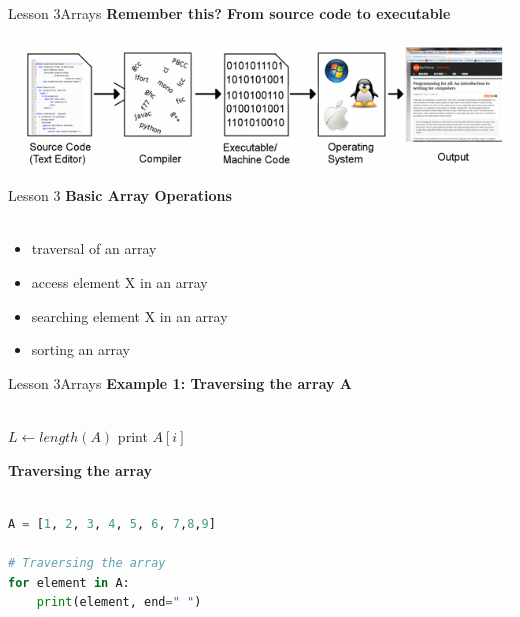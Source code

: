 \documentclass[aspectratio=1610]{beamer}
\begin{document}
\begin{frame}{Lesson 3}{Arrays}
\Large
\textbf{Remember this? From source code to executable}\\~\\ 
\includegraphics[scale=0.65]{Images/CompilationChain}
\end{frame}



\begin{frame}{Lesson 3}{}
\LARGE
\textbf{Basic Array Operations}\\~\\
\begin{itemize}
	\item traversal of an array
	\item access element X in an array
	\item searching element X in an array
	\item sorting an array
\end{itemize}
\end{frame}



\begin{frame}{Lesson 3}{Arrays}
\Large
\textbf{Example 1: Traversing the array A}\\~\\

\label{getArray}
\begin{algorithmic}[1]
 
\State $L\gets length(A)$
    \State print $A[i]$
\EndFor
\EndProcedure
\end{algorithmic}
\end{frame}


\begin{frame}[fragile]
\LARGE
\textbf{Traversing the array}\\~\\
\Large
\begin{lstlisting}[language=Python]
A = [1, 2, 3, 4, 5, 6, 7,8,9]

# Traversing the array
for element in A:
    print(element, end=" ")
    
\end{lstlisting}
\end{frame}
\end{document}

